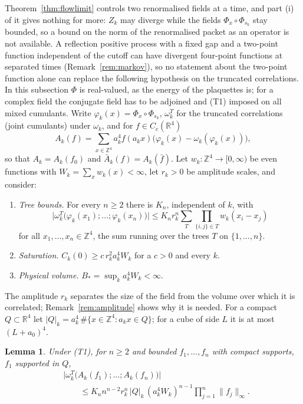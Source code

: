 \documentclass[11pt]{amsart}
\newtheorem{lemma}[theorem]{Lemma}
\theoremstyle{definition}
\theoremstyle{remark}
\numberwithin{equation}{section}
\newcommand{\R}{\mathbb{R}}
\newcommand{\Z}{\mathbb{Z}}
\begin{document}
Theorem~\ref{thm:flowlimit} controls two renormalised fields at a time, and
part (i) of it gives nothing for more: $Z_k$ may diverge while the fields
$\Phi_x\circ\Phi_{s_k}$ stay bounded, so a bound on the norm of the
renormalised packet as an operator is not available. A reflection positive
process with a fixed gap and a two-point function independent of the
cutoff can have divergent four-point functions at separated times
(Remark~\ref{rem:markov}), so no statement about the two-point function alone
can replace the following hypothesis on the truncated correlations. In this
subsection $\Phi$ is real-valued, as the energy of the plaquettes is; for a
complex field the conjugate field has to be adjoined and (T1) imposed on all
mixed cumulants. Write $\varphi_k(x)=\Phi_x\circ\Phi_{s_k}$,
$\omega^T_k$ for the truncated correlations (joint cumulants) under
$\omega_k$, and for $f\in C_c(\R^4)$
\[
A_k(f)=\sum_{x\in\Z^4}a_k^4f(a_kx)\bigl(\varphi_k(x)-\omega_k(\varphi_k(x))\bigr),
\]
so that $A_k=A_k(f_0)$ and $\bar A_k(f)=A_k(\bar f)$. Let
$w_k:\Z^4\to[0,\infty)$ be even functions with $W_k=\sum_xw_k(x)<\infty$, let
$r_k>0$ be amplitude scales, and consider:
\begin{enumerate}[label=\textup{(T\arabic*)},leftmargin=*]
\item \emph{Tree bounds.} For every $n\ge2$ there is $K_n$, independent of $k$,
with
\[
\bigl|\omega^T_k\bigl(\varphi_k(x_1);\dots;\varphi_k(x_n)\bigr)\bigr|
\le K_nr_k^n\sum_{T}\prod_{\{i,j\}\in T}w_k(x_i-x_j)
\]
for all $x_1,\dots,x_n\in\Z^4$, the sum running over the trees $T$ on
$\{1,\dots,n\}$.
\item \emph{Saturation.} $C_k(0)\ge c\,r_k^2a_k^4W_k$ for a $c>0$ and every $k$.
\item \emph{Physical volume.} $B_*=\sup_ka_k^4W_k<\infty$.
\end{enumerate}
The amplitude $r_k$ separates the size of the field from the volume over
which it is correlated; Remark~\ref{rem:amplitude} shows why it is needed.
For a compact $Q\subset\R^4$ let $|Q|_k=a_k^4\,\#\{x\in\Z^4:a_kx\in Q\}$; for a
cube of side $L$ it is at most $(L+a_0)^4$.

\begin{lemma}\label{lem:treesum}
Under \textup{(T1)}, for $n\ge2$ and bounded $f_1,\dots,f_n$ with compact
supports, $f_1$ supported in $Q$,
\[
\begin{split}
&\bigl|\omega^T_k\bigl(A_k(f_1);\dots;A_k(f_n)\bigr)\bigr|\\
&\qquad\le K_nn^{n-2}r_k^n\,|Q|_k\,(a_k^4W_k)^{n-1}\prod_{j=1}^n\|f_j\|_\infty .
\end{split}
\]
\end{lemma}
\end{document}

